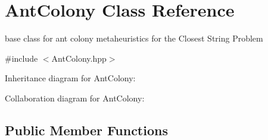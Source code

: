 \hypertarget{classAntColony}{}\section{Ant\+Colony Class Reference}
\label{classAntColony}


base class for ant colony metaheuristics for the Closest String Problem  




{\ttfamily \#include $<$Ant\+Colony.\+hpp$>$}



Inheritance diagram for Ant\+Colony\+:


Collaboration diagram for Ant\+Colony\+:
\subsection*{Public Member Functions}
